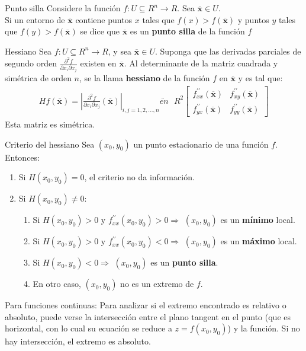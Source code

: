 \documentclass[a4paper, twoside]{article}
\numberwithin{equation}{section}
\numberwithin{figure}{section}
\numberwithin{table}{section}
\newcommand{\vect}[1]{\overline{\textbf{#1}}}
\begin{document}
\begin{definicion*}{Punto silla}
	Considere la función $f:U\subseteq R^n \to R$. Sea $\vect{x} \in U$.\\
	
	Si un entorno de $\vect{x}$ contiene puntos $x$ tales que $f(x) > f(\vect{x})$ y puntos $y$ tales que $f(y) > f(\vect{x})$ se dice que $\vect{x}$ es un \textbf{punto silla} de la función $f$
\end{definicion*}

\begin{definicion*}{Hessiano}
	Sea $f:U\subseteq R^n \to R$, y sea $\vect{x} \in U$. Suponga que las derivadas parciales de segundo orden $\frac{\partial^2 f}{\partial x_i \partial x_j}$ existen en $\vect{x}.$ Al determinante de la matriz cuadrada y simétrica de orden $n$, se la llama \textbf{hessiano} de la función $f$ en $\vect{x}$ y es tal que:
	\begin{align}
		Hf(\vect{x})=\left|\frac{\partial^2 f}{\partial x_i \partial x_j }\left(\vect{x}\right)\right|_{i,j=1,2,\ldots,n}\underrightarrow{en} \text{ } R^2\left[\begin{array}{cc}
		f_{xx}^{\prime\prime}\left(\vect{x}\right) & f_{xy}^{\prime\prime}\left(\vect{x}\right)\\
		f_{yx}^{\prime\prime}\left(\vect{x}\right) & f_{yy}^{\prime\prime}\left(\vect{x}\right)\end{array}\right]
	\end{align}
	Esta matriz es simétrica.
\end{definicion*}

\begin{teorema*}{Criterio del hessiano}
	Sea $(x_0,y_0)$ un punto estacionario de una función $f$. Entonces:
	\begin{enumerate}
		\item Si $H(x_0,y_0)=0$, el criterio no da información.
		\item Si $H(x_0,y_0)\ne0:$
		\begin{enumerate}
			\item Si $H(x_0,y_0)>0\mbox{ y }f_{xx}^{\prime\prime}(x_0,y_0)>0\Longrightarrow$ $(x_{0},y_{0})$ es un \textbf{mínimo} local.
			\item Si $H(x_0,y_0)>0\mbox{ y }f_{xx}^{\prime\prime}(x_0,y_0)<0\Longrightarrow$ $(x_{0},y_{0})$ es un \textbf{máximo} local.
			\item Si $H(x_0,y_0)<0\Longrightarrow$ $(x_0,y_0)$ es un \textbf{punto silla}.
			\item En otro caso, $(x_0,y_0)$ no es un extremo de $f$.
		\end{enumerate}
	\end{enumerate}
	Para funciones continuas: Para analizar si el extremo encontrado es relativo o absoluto, puede verse la intersección entre el plano tangent en el punto (que es horizontal, con lo cual su ecuación se reduce a $z=f(x_0,y_0)$) y la función. Si no hay intersección, el extremo es absoluto.
\end{teorema*}
\end{document}

